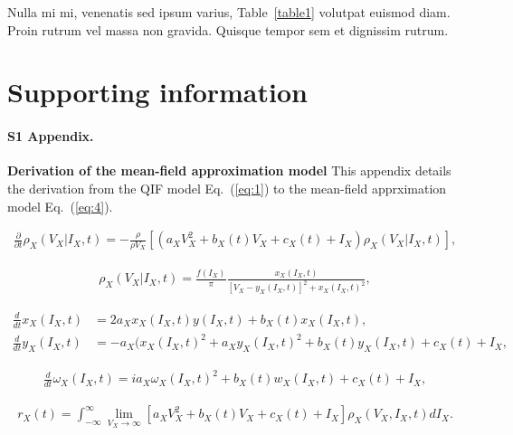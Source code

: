 \documentclass[10pt,letterpaper]{article}
\begin{document}
Nulla mi mi, venenatis sed ipsum varius, Table~\ref{table1} volutpat euismod diam. Proin rutrum vel massa non gravida. Quisque tempor sem et dignissim rutrum. 

\section*{Supporting information}


\paragraph*{S1 Appendix.}
\label{S1_Appendix}
{\bf Derivation of the mean-field approximation model} This appendix details the derivation from the QIF model Eq.~(\ref{eq:1}) to the mean-field apprximation model Eq.~(\ref{eq:4}).

\begin{eqnarray}
\label{eq:7}
    \frac{\partial}{\partial t}\rho_{X}(V_{X}|I_{X},t)=-\frac{\rho}{\rho V_{X}}\left[ \left( a_{X}V_{X}^{2} + b_{X}(t)V_{X} + c_{X}(t) + I_{X}\right) \rho_{X}(V_{X}|I_{X},t) \right],
\end{eqnarray}

\begin{eqnarray}
\label{eq:8}
    \rho_{X}(V_{X}|I_{X},t) = \frac{f(I_{X})}{\pi}\frac{x_{X}(I_{X},t)}{\left[ V_{X}-y_{X}(I_{X},t)\right]^{2} + x_{X}(I_{X},t)^{2}},
\end{eqnarray}

\begin{subequations}
\label{eq:9}
\begin{align}
    \frac{d}{dt}x_{X}(I_{X},t) &= 2a_{X}x_{X}(I_{X},t)y(I_{X},t) + b_{X}(t)x_{X}(I_{X},t), \label{eq:9a} \\
    \frac{d}{dt}y_{X}(I_{X},t) &= -a_{X}(x_{X}(I_{X},t)^{2} + a_{X}y_{X}(I_{X},t)^{2} + b_{X}(t)y_{X}(I_{X},t) + c_{X}(t) + I_{X}, \label{eq:9b}
\end{align}
\end{subequations}

\begin{eqnarray}
\label{eq:11}
    \frac{d}{dt}\omega_{X}(I_{X},t) = ia_{X}\omega_{X}(I_{X},t)^{2} + b_{X}(t)w_{X}(I_{X},t) + c_{X}(t) + I_{X},
\end{eqnarray}

\begin{eqnarray}
\label{eq:12}
    r_{X}(t)= \int_{-\infty}^{\infty} \lim_{V_{X}\to\infty} \left[ a_{X}V_{X}^{2}+b_{X}(t)V_{X}+c_{X}(t)+I_{X}\right]\rho_{X}(V_{X},I_{X},t)dI_{X}.
\end{eqnarray}
\end{document}
